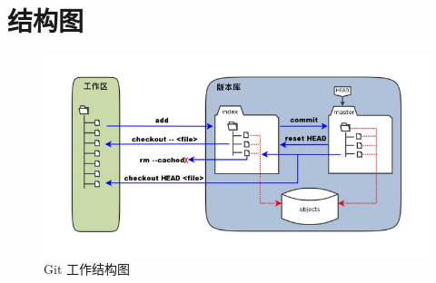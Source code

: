 \documentclass[UTF8,a4paper,12pt]{ctexbook}
\begin{document}
	  \section{结构图}
	  
		  \begin{figure}[h]
		  	\centering
		  	\includegraphics[scale = 0.8]{git-arc.jpg}
		  	\caption{Git 工作结构图}
		  \end{figure}
		  
\end{document}
